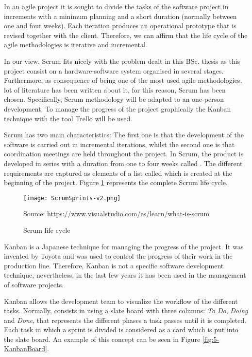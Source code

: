 \documentclass{pre-tfg}
\begin{document}
In an agile project it is sought to divide the tasks of the software project in increments with a minimum planning and a short duration (normally between one and four weeks). Each iteration produces an operational prototype that is revised together with the client. Therefore, we can affirm that the life cycle of the agile methodologies is iterative and incremental.

In our view, Scrum fits nicely with the problem dealt in this BSc. thesis as this project consist on a hardware-software system organised in several stages. Furthermore, as consequence of being one of the most used agile methodologies, lot of literature has been written about it, for this reason, Scrum has been chosen. Specifically, Scrum methodology \cite{ScrumGuide} will be adapted to an one-person development. To manage the progress of the project graphically the Kanban technique with the tool Trello will be used.

Scrum has two main characteristics: The first one is that the development of the software is carried out in incremental iterations, whilst the second one is that coordination meetings are held throughout the project. In Scrum, the product is developed in series with a duration from one to four weeks called . The different requirements are captured as elements of a list called  which is created at the beginning of the project. Figure \ref{fig:5-ScrumSprints} represents the complete Scrum life cycle.

\begin{figure}[!h]
	\begin{center}
		\texttt{[image: ScrumSprints-v2.png]}	
		\caption{Scrum life cycle}{Source: \url{https://www.visualstudio.com/es/learn/what-is-scrum}}
		\label{fig:5-ScrumSprints}
	\end{center}
\end{figure}

Kanban \cite{Gar11,KS10} is a Japanese technique for managing the progress of the project. It was invented by Toyota and was used to control the progress of their work in the production line. Therefore, Kanban is not a specific software development technique, nevertheless, in the last few years it has been used in the management of software projects.

Kanban allows the development team to visualize the workflow of the different tasks. Normally, consists in using a slate board with three columns: \emph{To Do}, \emph{Doing} and \emph{Done}, that represents the different phases a task passes until it is completed. Each task in which a sprint is divided is considered as a card which is put into the slate board. An example of this concept can be seen in Figure \ref{fig:5-KanbanBoard}.
\end{document}
